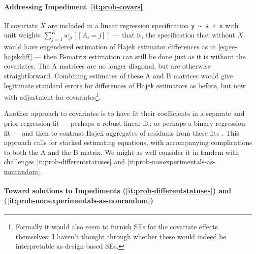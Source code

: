 \paragraph{Addressing Impediment~\ref{it:prob-covars}}
If covariate \(X\)  are included in a linear regression specification
\verb|y ~ a + x| with
unit weights $\sum_{j=1}^{K}w_{ji}[\![A_{i}=j]\!]$ --- that is, the
specification that without \(X\) would have engendered estimation
of Hajek estimator differences as in \eqref{eq:ee-hajekdiff} ---
then B-matrix estimation can still be done just
as it is without the covariates.  The A matrices are no longer
diagonal, but are otherwise straightforward.  Combining estimates of
these A and B matrices would give legitimate standard errors for
differences of Hajek estimators as before, but now with adjustment for
covariates\footnote{Formally it would also seem to furnish SEs for the
covariate effects themselves; I haven't thought through whether these
would indeed be interpretable as design-based SEs.%
}.

Another approach to covariates is to have fit their coefficients in a separate and
prior regression fit --- perhaps a robust linear fit; or perhaps a binary
regression fit --- and then to contrast Hajek aggregates of residuals
from these fits \citep{gelmanPardoe07,bowers:hans:2008}.  This approach calls for
stacked estimating equations, with accompanying complications to both
the A and the B matrix. We might as well consider it in tandem with
challenges \ref{it:prob-differentstatuses} and
\ref{it:prob-nonexperimentals-as-nonrandom}.

\paragraph{Toward solutions to Impediments (\ref{it:prob-differentstatuses}) and
(\ref{it:prob-nonexperimentals-as-nonrandom})}


